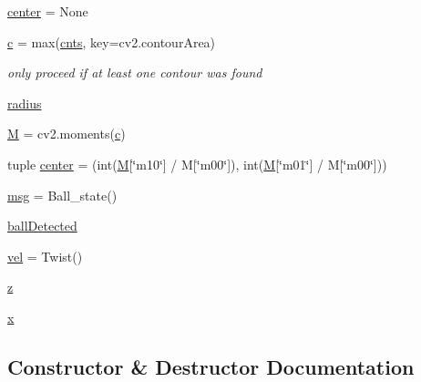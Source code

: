 \begin{DoxyCompactItemize}
\hyperlink{classcvtest_1_1image__feature_a9522bc98855a5dbdf4515845eb787c76}{center} = None
\item 
\hyperlink{classcvtest_1_1image__feature_a1293e76127df14d91e3abd546415d7f3}{c} = max(\hyperlink{classcvtest_1_1image__feature_aa27ede44db1c89ea7519de78a7b762ac}{cnts}, key=cv2.\+contour\+Area)
\begin{DoxyCompactList}\small\item\em only proceed if at least one contour was found \end{DoxyCompactList}\item 
\hyperlink{classcvtest_1_1image__feature_a2797d7a001d5b19a8afcc094863a0421}{radius}
\item 
\hyperlink{classcvtest_1_1image__feature_a0affcc52451defb08bf591514f2b2c64}{M} = cv2.\+moments(\hyperlink{classcvtest_1_1image__feature_a1293e76127df14d91e3abd546415d7f3}{c})
\item 
tuple \hyperlink{classcvtest_1_1image__feature_a2ae34db381b06abd2545e21c6f7cc2b0}{center} = (int(\hyperlink{classcvtest_1_1image__feature_a0affcc52451defb08bf591514f2b2c64}{M}\mbox{[}\char`\"{}m10\char`\"{}\mbox{]} / M\mbox{[}\char`\"{}m00\char`\"{}\mbox{]}), int(\hyperlink{classcvtest_1_1image__feature_a0affcc52451defb08bf591514f2b2c64}{M}\mbox{[}\char`\"{}m01\char`\"{}\mbox{]} / M\mbox{[}\char`\"{}m00\char`\"{}\mbox{]}))
\item 
\hyperlink{classcvtest_1_1image__feature_ad2980a48f7e0a2dc184f8bfa6dee1e8c}{msg} = Ball\+\_\+state()
\item 
\hyperlink{classcvtest_1_1image__feature_af899715bd474bd282df372479b5c1f74}{ball\+Detected}
\item 
\hyperlink{classcvtest_1_1image__feature_a75da95bdcce4310326a15c631ce7ba55}{vel} = Twist()
\item 
\hyperlink{classcvtest_1_1image__feature_ad4621c94d0673c73f05da9f2c5c1d405}{z}
\item 
\hyperlink{classcvtest_1_1image__feature_a81375475ba17a89b219d6627ab1b88f7}{x}
\end{DoxyCompactItemize}


\subsection{Constructor \& Destructor Documentation}
